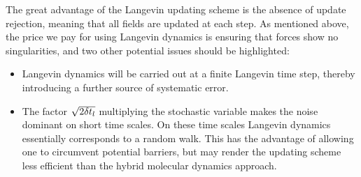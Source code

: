 The great advantage of the Langevin updating scheme is the absence of update rejection, meaning that all fields are updated at each step. As mentioned above, the price we pay for using Langevin dynamics is ensuring that forces show no singularities, and two other potential issues should be highlighted:
\begin{itemize}
\item   Langevin dynamics will be carried out at a finite  Langevin time step, thereby introducing a further source of systematic error.
\item   The factor $\sqrt{2 \delta t_{l}} $   multiplying the stochastic variable makes the  noise dominant  on short time scales.  On these time scales  Langevin dynamics essentially  corresponds to a random walk. This has the advantage of allowing one to circumvent potential barriers, but may render the updating scheme less efficient than the hybrid molecular dynamics approach.
\end{itemize}

